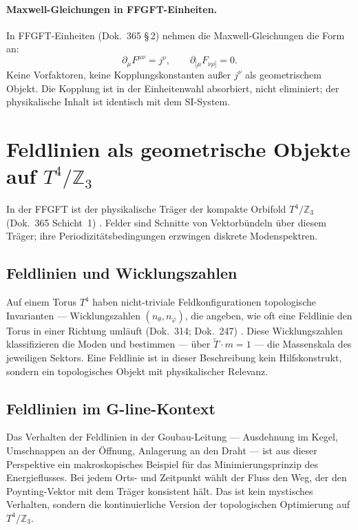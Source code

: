 \paragraph{Maxwell-Gleichungen in FFGFT-Einheiten.}
In FFGFT-Einheiten (Dok.~365 §\,2) nehmen die Maxwell-Gleichungen die Form an:
\[
  \partial_\mu F^{\mu\nu} = j^\nu, \qquad \partial_{[\mu}F_{\nu\rho]}=0.
\]
Keine Vorfaktoren, keine Kopplungskonstanten außer $j^\nu$ als geometrischem
Objekt. Die Kopplung ist in der Einheitenwahl absorbiert, nicht eliminiert;
der physikalische Inhalt ist identisch mit dem SI-System.

\section{Feldlinien als geometrische Objekte auf $T^4/\mathbb{Z}_3$}

In der FFGFT ist der physikalische Träger der kompakte Orbifold
$T^4/\mathbb{Z}_3$ (Dok.~365 Schicht~1) \SetzM. Felder sind Schnitte von
Vektorbündeln über diesem Träger; ihre Periodizitätsbedingungen erzwingen
diskrete Modenspektren.

\subsection*{Feldlinien und Wicklungszahlen}

Auf einem Torus $T^4$ haben nicht-triviale Feldkonfigurationen
topologische Invarianten --- Wicklungszahlen $(n_\theta, n_\varphi)$,
die angeben, wie oft eine Feldlinie den Torus in einer Richtung umläuft
(Dok.~314; Dok.~247) \BM. Diese Wicklungszahlen klassifizieren die
Moden und bestimmen --- über $\tilde{T}\cdot m=1$ --- die Massenskala des
jeweiligen Sektors. Eine Feldlinie ist in dieser Beschreibung kein
Hilfskonstrukt, sondern ein topologisches Objekt mit physikalischer
Relevanz.

\subsection*{Feldlinien im G-line-Kontext}

Das Verhalten der Feldlinien in der Goubau-Leitung --- Ausdehnung im Kegel,
Umschnappen an der Öffnung, Anlagerung an den Draht --- ist aus dieser
Perspektive ein makroskopisches Beispiel für das Minimierungsprinzip des
Energieflusses. Bei jedem Orts- und Zeitpunkt wählt der Fluss den Weg,
der den Poynting-Vektor mit dem Träger konsistent hält. Das ist kein
mystisches Verhalten, sondern die kontinuierliche Version der topologischen
Optimierung auf $T^4/\mathbb{Z}_3$.

